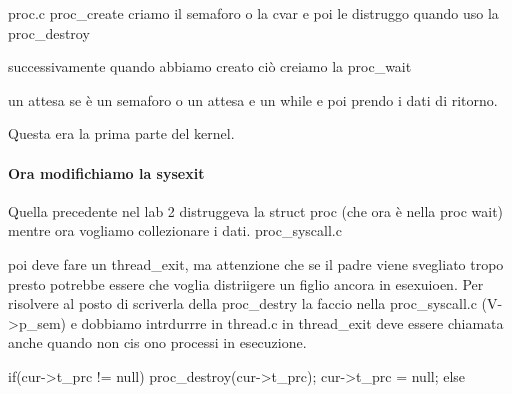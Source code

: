 proc.c proc\_create criamo il semaforo o la cvar e poi le distruggo 
quando uso la proc\_destroy

successivamente quando abbiamo creato ciò creiamo la proc\_wait

un attesa se è un semaforo o un attesa e un while  e poi 
prendo i dati di ritorno.

Questa era la prima parte del kernel.

\paragraph{Ora modifichiamo la sysexit}
Quella precedente nel lab 2 distruggeva la struct proc (che ora è nella proc
wait) mentre ora vogliamo collezionare i dati. 
proc\_syscall.c

poi deve fare un thread\_exit, ma attenzione che 
se il padre viene svegliato tropo presto potrebbe essere
che voglia distriigere un figlio ancora in esexuioen.
Per risolvere al posto di scriverla della proc\_destry la faccio nella
proc\_syscall.c (V->p\_sem) e dobbiamo intrdurrre in thread.c in thread\_exit
deve essere chiamata anche quando non cis ono processi in esecuzione.


if(cur->t\_prc != null) {
  proc\_destroy(cur->t\_prc);
  cur->t\_prc = null;
}else{

}







